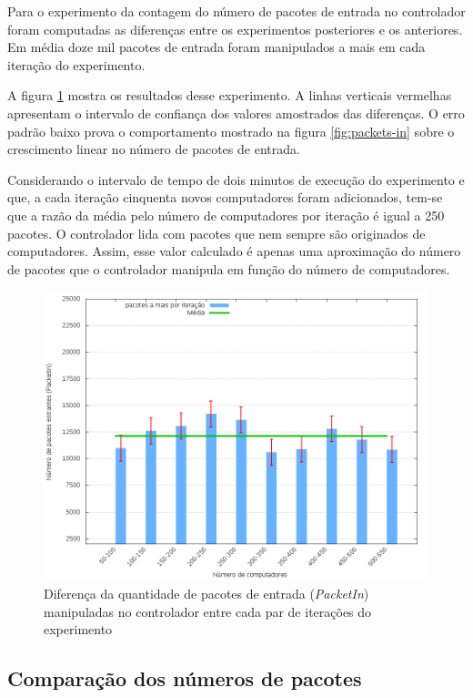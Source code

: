 Para o experimento da contagem do número de pacotes de entrada no controlador
foram computadas as diferenças entre os experimentos posteriores e os
anteriores.
Em média doze mil pacotes de entrada foram manipulados a mais em cada 
iteração do experimento.

A figura \ref{fig:packets-in-stats} mostra os resultados desse experimento.
A linhas verticais vermelhas apresentam o intervalo de confiança dos valores
amostrados das diferenças. 
O erro padrão baixo prova o comportamento mostrado na figura 
\ref{fig:packets-in} sobre o crescimento linear no número de pacotes de 
entrada.

Considerando o intervalo de tempo de dois minutos de execução do experimento e 
que, a cada iteração cinquenta novos computadores foram adicionados, 
tem-se que a razão da média pelo número de computadores por iteração é igual 
a 250 pacotes. 
O controlador lida com pacotes que nem sempre são originados de computadores.
Assim, esse valor calculado é apenas uma aproximação do número de pacotes 
que o controlador manipula em função do número de computadores.

\begin{figure}[!htb]
    \centering
    \label{fig:packets-in-stats}
    \includegraphics[width=\linewidth]{img/packets-in-stats}
    \caption{Diferença da quantidade de pacotes de entrada (\emph{PacketIn})
    manipuladas no controlador entre cada par de iterações do experimento}
\end{figure}

\subsection{Comparação dos números de pacotes}

